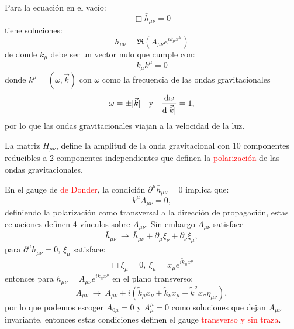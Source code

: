 \documentclass[../main]{subfiles}
\begin{document}
Para la ecuación en el vacío:
\begin{equation}
    \Box \bar{h}_{\mu\nu}=0
\end{equation}
tiene soluciones:
\begin{equation}
    \bar{h}_{\mu\nu}=\Re(A_{\mu\nu}e^{ik_{\mu}x^{\mu}})
\end{equation}
de donde $k_{\mu}$ debe ser un vector nulo que cumple con:
\begin{equation}
    k_{\mu}k^{\mu}=0
\end{equation}
donde $k^{\mu}=(\omega, \vec{k})$ con $\omega$ como la frecuencia de las ondas gravitacionales 
\begin{equation}
    \omega=\pm |\vec{k}| \quad \text{y} \quad \dv{\omega}{|\vec{k}|}=1,
\end{equation}
por lo que las ondas gravitacionales viajan a la velocidad de la luz.

La matriz $H_{\mu\nu}$, define la amplitud de la onda gravitacional con 10 componentes reducibles a 2 componentes independientes que definen la \textcolor{red}{polarización} de las ondas gravitacionales.

En el gauge de \textcolor{red}{de Donder}, la condición $\partial^{\mu}\bar{h}_{\mu\nu}=0$ implica que:
\begin{equation}
    k^{\mu}A_{\mu\nu}=0,
\end{equation}
definiendo la polarización como transversal a la dirección de propagación, estas ecuaciones definen 4 vínculos sobre $A_{\mu\nu}$. Sin embargo $A_{\mu\nu}$ satisface 
\begin{equation}
    \bar{h}_{\mu\nu} \ \rightarrow \ \bar{h}_{\mu\nu}+\partial_{\mu}\xi_{\nu}+\partial_{\nu}\xi_{\mu},
\end{equation}
para $\partial^{\mu}h_{\mu\nu}=0$, $\xi_{\mu}$ satisface:
\begin{equation}
    \Box \xi_{\mu}=0, \ \xi_{\mu}=x_{\mu}e^{i\tilde{k}_{\mu} x^{\mu}}
\end{equation}
entonces para $\bar{h}_{\mu\nu}=A_{\mu\nu}e^{ik_{\mu}x^{\mu}}$ en el plano transverso:
\begin{equation}
    A_{\mu\nu} \ \rightarrow \ A_{\mu\nu}+i(\tilde{k}_{\mu}x_{\nu}+\tilde{k}_{\nu}x_{\mu}-\tilde{k}^{\sigma}x_{\sigma}\eta_{\mu\nu}),
\end{equation}
por lo que podemos escoger $A_{0\mu}=0$ y $A^{\mu}_{\mu}=0$ como soluciones que dejan $A_{\mu\nu}$ invariante, entonces estas condiciones definen el gauge \textcolor{red}{transverso y sin traza}.
\end{document}
